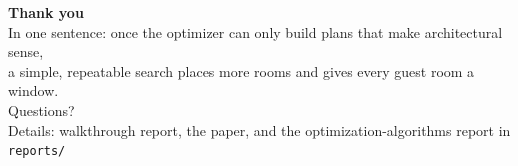 \documentclass[9pt,aspectratio=169]{beamer}
\begin{document}
{
\begin{frame}[plain]
\vspace*{1.2cm}
{\color{paper}\fontsize{26}{30}\selectfont\bfseries Thank you}\\[0.6cm]
{\color{paper!85}\large In one sentence: once the optimizer can only build plans that make architectural sense,\\ a simple, repeatable search places more rooms and gives every guest room a window.}\\[1.0cm]
{\color{amber}\large Questions?}\\[0.9cm]
{\color{paper!65}\small Details: walkthrough report, the paper, and the optimization-algorithms report in \texttt{reports/}}
\end{frame}}
\end{document}
